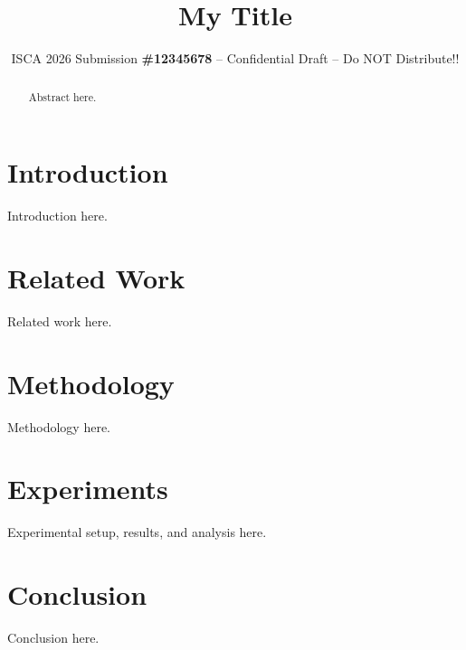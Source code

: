\documentclass[conference]{IEEEtran}
\begin{document}
\pdfpagewidth=8.5in
\pdfpageheight=11in

\newcommand{\iscasubmissionnumber}{12345678}

\title{My Title}
\author{\normalsize{ISCA 2026 Submission
    \textbf{\#\iscasubmissionnumber} -- Confidential Draft -- Do NOT Distribute!!}}

\maketitle
\thispagestyle{plain}
\pagestyle{plain}


\begin{abstract}
Abstract here.
\end{abstract}

\section{Introduction}
\label{sec:intro}
Introduction here.

\section{Related Work}
\label{sec:related_work}
Related work here.

\section{Methodology}
\label{sec:method}
Methodology here.

\section{Experiments}
\label{sec:experiments}
Experimental setup, results, and analysis here.

\section{Conclusion}
\label{sec:conclusion}
Conclusion here.



\end{document}

